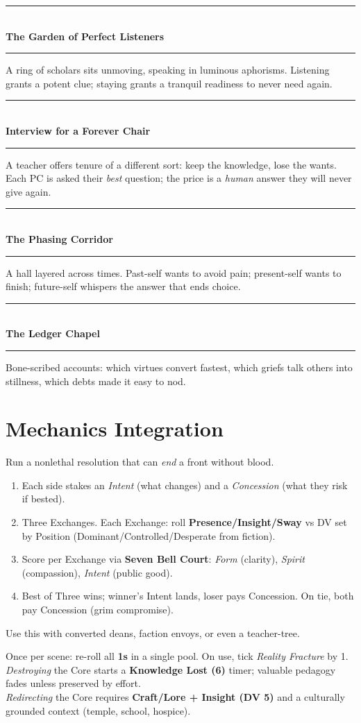 \documentclass[11pt,twoside]{book}
\newcommand{\Mechanic}[2]{%
  \begin{mechanicbox}[frametitle={#1}]
    #2
  \end{mechanicbox}
}
\newcommand{\Setpiece}[1]{%
  \needspace{4\baselineskip}%
  \begin{center}
    \rule{\textwidth}{1pt}\\
    \textbf{\sffamily\Large #1}\\
    \rule{\textwidth}{1pt}
  \end{center}
}
\begin{document}
\Setpiece{The Garden of Perfect Listeners}
A ring of scholars sits unmoving, speaking in luminous aphorisms. Listening grants a potent clue; staying grants a tranquil readiness to never need again.

\Setpiece{Interview for a Forever Chair}
A teacher offers tenure of a different sort: keep the knowledge, lose the wants. Each PC is asked their \emph{best} question; the price is a \emph{human} answer they will never give again.

\Setpiece{The Phasing Corridor}
A hall layered across times. Past-self wants to avoid pain; present-self wants to finish; future-self whispers the answer that ends choice.

\Setpiece{The Ledger Chapel}
Bone-scribed accounts: which virtues convert fastest, which griefs talk others into stillness, which debts made it easy to nod.

\chapter{Mechanics Integration}

\Mechanic{Truth Duel (Debate as Blade)}{
Run a nonlethal resolution that can \emph{end} a front without blood.
\begin{enumerate}[leftmargin=*]
  \item Each side stakes an \emph{Intent} (what changes) and a \emph{Concession} (what they risk if bested).
  \item Three Exchanges. Each Exchange: roll \textbf{Presence/Insight/Sway} vs DV set by Position (Dominant/Controlled/Desperate from fiction).
  \item Score per Exchange via \textbf{Seven Bell Court}: \emph{Form} (clarity), \emph{Spirit} (compassion), \emph{Intent} (public good).
  \item Best of Three wins; winner's Intent lands, loser pays Concession. On tie, both pay Concession (grim compromise).
\end{enumerate}
Use this with converted deans, faction envoys, or even a teacher-tree.
}

\Mechanic{Curriculum Core (Major Asset, 8 XP)}{
Once per scene: re-roll all \textbf{1s} in a single pool. On use, tick \emph{Reality Fracture} by 1.\\
\emph{Destroying} the Core starts a \textbf{Knowledge Lost (6)} timer; valuable pedagogy fades unless preserved by effort.\\
\emph{Redirecting} the Core requires \textbf{Craft/Lore + Insight (DV 5)} and a culturally grounded context (temple, school, hospice).
}
\end{document}
